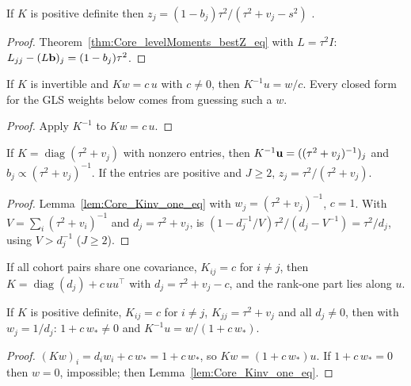 \begin{theorem}\label{thm:Core_bestZ_eq}
  \leanok
  If $K$ is positive definite then
  $z_j = (1-b_j)\tau^2/(\tau^2 + v_j - s^2)$ .
\end{theorem}
\begin{proof}
  \leanok
  Theorem~\ref{thm:Core_levelMoments_bestZ_eq} with $L = \tau^2 I$:
  $L_{jj} - (L\mathbf{b})_j = (1-b_j)\tau^2$.
\end{proof}

\begin{lemma}[Solving $Kx = u$]\label{lem:Core_Kinv_one_eq}
  \leanok
  If $K$ is invertible and $Kw = c\,u$ with $c \ne 0$, then $K^{-1}u = w/c$.
  Every closed form for the GLS weights below comes from guessing such a $w$.
\end{lemma}
\begin{proof}
  \leanok
  Apply $K^{-1}$ to $Kw = c\,u$.
\end{proof}

\begin{theorem}[Diagonal $K$]\label{thm:Core_diag}
  \leanok
  If $K = \operatorname{diag}(\tau^2 + v_j)$ with nonzero entries, then
  $K^{-1}\mathbf{u} = ((\tau^2 + v_j)^{-1})_j$ and
  $b_j \propto (\tau^2 + v_j)^{-1}$. If the entries are positive and $J \ge 2$,
  $z_j = \tau^2/(\tau^2 + v_j)$.
\end{theorem}
\begin{proof}
  \leanok
  Lemma~\ref{lem:Core_Kinv_one_eq} with $w_j = (\tau^2+v_j)^{-1}$, $c = 1$. With $V = \sum_i (\tau^2+v_i)^{-1}$ and
  $d_j = \tau^2 + v_j$,  is
  $(1 - d_j^{-1}/V)\tau^2/(d_j - V^{-1}) = \tau^2/d_j$, using
  $V > d_j^{-1}$ ($J \ge 2$).
\end{proof}

If all cohort pairs share one covariance, $K_{ij} = c$ for $i \ne j$, then
$K = \operatorname{diag}(d_j) + c\,uu^\top$ with $d_j = \tau^2 + v_j - c$, and
the rank-one part lies along $u$.

\begin{lemma}\label{lem:Core_Kinv_one_of_equalCov}
  \leanok
  If $K$ is positive definite, $K_{ij} = c$ for $i \ne j$,
  $K_{jj} = \tau^2 + v_j$ and all $d_j \ne 0$, then with $w_j = 1/d_j$:
  $1 + c\,w_* \ne 0$ and $K^{-1}u = w/(1 + c\,w_*)$.
\end{lemma}
\begin{proof}
  \leanok
  $(Kw)_i = d_i w_i + c\,w_* = 1 + c\,w_*$, so $Kw = (1 + c\,w_*)u$. If
  $1 + c\,w_* = 0$ then $w = 0$, impossible; then Lemma~\ref{lem:Core_Kinv_one_eq}.
\end{proof}

